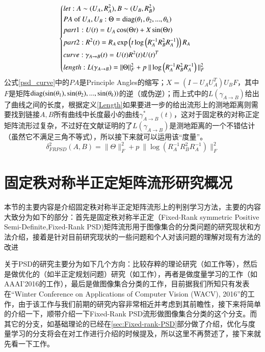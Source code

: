 \begin{equation}
\label{psd_curve}
\left\{
\begin{aligned}
&let:A\sim(U_A,R_{A}^{2}),B\sim(U_B,R_{B}^{2})\\
&PA\text{ of }U_A,U_B:\Theta={\rm diag}(\theta_1,\theta_2,...,\theta_k)\\
&part1:U(t)=U_A\cos(\Theta t)+X\sin(\Theta t)\\
&part2:R^2(t)=R_{A}\exp\left(t\log\left(R_{A}^{-1}R_{B}^{2}R_{A}^{-1}\right)\right)R_{A}\\
&curve:\gamma_{A \rightarrow B}(t)=U(t)R^{2}(t)U(t)^{T}\\
&length:L(\gamma_{A \rightarrow B})=\|\Theta\|_{F}^{2}+p~\|\log\left(R_{A}^{-1}R_{B}^{2}R_{A}^{-1}\right)\|_{F}^{2}
\end{aligned}
\right.
\end{equation}
公式\ref{psd_curve}中的$PA$是Principle Angles的缩写；$X=(I-U_AU_{A}^{T})U_BF$，其中$F$是矩阵${\rm diag}(\sin(\theta_1),\sin(\theta_2),...,\sin(\theta_k))$的逆（或伪逆）；而上式中的$L(\gamma_{A \rightarrow B})$给出了曲线之间的长度，根据定义\ref{Length}如果要进一步的给出流形上的测地距离则需要找到链接$A,B$所有曲线中长度最小的曲线$\gamma_{A \rightarrow B}^{*}(t)$，这对于固定秩的对称正定矩阵流形过复杂，不过好在文献\cite{PSD_Riemannian}证明的了$L(\gamma_{A \rightarrow B})$是测地距离的一个不错估计（虽然它不满足三角不等式），所以接下来就可以运用该“度量”。
\begin{equation}
\label{polar_metric}
\delta^{2}_{FRPSD}(A,B)=\|\Theta\|_{F}^{2}+p~\|\log\left(R_{A}^{-1}R_{B}^{2}R_{A}^{-1}\right)\|_{F}^{2}
\end{equation}
\section{固定秩对称半正定矩阵流形研究概况}
\label{sec:Fixed-Rank-PSD-Current}
本节的主要内容是介绍固定秩对称半正定矩阵流形上的判别学习方法，主要的内容大致分为如下的部分：首先是固定秩对称半正定（Fixed-Rank symmetric Positive Semi-Definite,Fixed-Rank PSD)矩阵流形用于图像集合的分类问题的研究现状和方法介绍，接着是针对目前研究现状的一些问题和个人对该问题的理解对现有方法的改进

关于PSD的研究主要分为如下几个方向：比较存粹的理论研究（如工作\cite{PSD_Riemannian,PSD_Regression}等），然后是做优化的（如半正定规划问题）研究（如工作\cite{PSD_Opt1}），再者是做度量学习的工作（如AAAI'2016的工作\cite{PSD_AAAI}），最后是做图像集合分类的工作，目前据我们所知只有发表在“Winter Conference on Applications of Computer Vision (WACV), 2016”的工作\cite{PSD_WACV}，由于该工作与我们前期的研究内容非常相近并考虑到其前瞻性，接下来将简单的介绍一下，顺带介绍一下Fixed-Rank PSD流形做图像集合分类的这个分支。而其它的分支，如基础理论的已经在\ref{sec:Fixed-rank-PSD}部分做了介绍，优化与度量学习的分支将会在对工作\cite{PSD_AAAI}进行介绍的时候提及，所以这里不再赘述了，接下来就先看一下工作\cite{PSD_WACV}。

